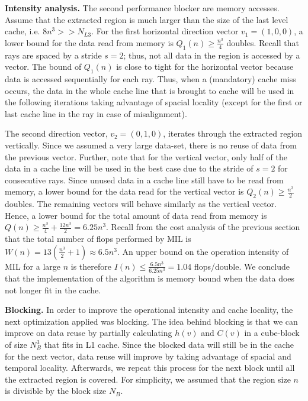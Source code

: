 \documentclass[letterpaper]{article}
\newcommand{\mypar}[1]{{\bf #1.}}
\begin{document}
\mypar{Intensity analysis}
The second performance blocker are memory accesses. Assume that the extracted region is much larger than the size of the last level cache, i.e. $8n^3 >> N_{L3}$. For the first horizontal direction vector $v_1 = (1,0,0)$, a lower bound for the data read from memory is $Q_1(n) \geq \frac{n^3}{4}$ doubles. Recall that rays are spaced by a stride $s=2$; thus, not all data in the region is accessed by a vector. The bound of $Q_1(n)$ is close to tight for the horizontal vector because data is accessed sequentially for each ray. Thus, when a (mandatory) cache miss occurs, the data in the whole cache line that is brought to cache will be used in the following iterations taking advantage of spacial locality (except for the first or last cache line in the ray in case of misalignment). 

The second direction vector, $v_2 = (0,1,0)$, iterates through the extracted region vertically. Since we assumed a very large data-set, there is no reuse of data from the previous vector. Further, note that for the vertical vector, only half of the data in a cache line will be used in the best case due to the stride of $s=2$ for consecutive rays. Since unused data in a cache line still have to be read from memory, a lower bound for the data read for the vertical vector is $Q_2(n) \geq \frac{n^3}{2}$ doubles. The remaining vectors will behave similarly as the vertical vector. Hence, a lower bound for the total amount of data read from memory is $Q(n) \geq \frac{n^3}{4} + \frac{12n^3}{2} = 6.25n^3$. Recall from the cost analysis of the previous section that the total number of flops performed by MIL is $W(n)=13(\frac{n^{3}}{2}+1) \approx 6.5n^3$. An upper bound on the operation intensity of MIL for a large $n$ is therefore $I(n) \leq \frac{6.5n^3}{6.25n^3} = 1.04$ flops/double. We conclude that the implementation of the algorithm is memory bound when the data does not longer fit in the cache. 

\mypar{Blocking}
In order to improve the operational intensity and cache locality, the next optimization applied was blocking. The idea behind blocking is that we can improve on data reuse by partially calculating $h(v)$ and $C(v)$ in a cube-block of size $N_B^3$ that fits in L1 cache. Since the blocked data will still be in the cache for the next vector, data reuse will improve by taking advantage of spacial and temporal locality. Afterwards, we repeat this process for the next block until all the extracted region is covered. For simplicity, we assumed that the region size $n$ is divisible by the block size $N_B$.
\end{document}

